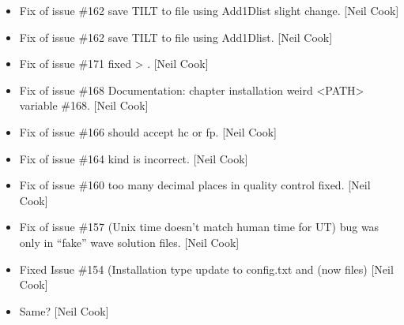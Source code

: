 \documentclass[a4paper,10pt,english]{report}
\begin{document}
\begin{itemize}
\item {} 
Fix of issue \#162 \sphinxhyphen{}  save TILT to file using Add1Dlist \sphinxhyphen{}
slight change. {[}Neil Cook{]}

\item {} 
Fix of issue \#162 \sphinxhyphen{}  save TILT to file using Add1Dlist. {[}Neil
Cook{]}

\item {} 
Fix of issue \#171 \sphinxhyphen{} fixed  \textendash{}\textgreater{}
. {[}Neil Cook{]}

\item {} 
Fix of issue \#168 \sphinxhyphen{} Documentation: chapter installation weird \textless{}PATH\textgreater{}
variable \#168. {[}Neil Cook{]}

\item {} 
Fix of issue \#166 \sphinxhyphen{}  should accept hc or fp. {[}Neil Cook{]}

\item {} 
Fix of issue \#164 \sphinxhyphen{}  kind is incorrect. {[}Neil Cook{]}

\item {} 
Fix of issue \#160 \sphinxhyphen{} too many decimal places in quality control \sphinxhyphen{}
fixed. {[}Neil Cook{]}

\item {} 
Fix of issue \#157 (Unix time doesn’t match human time for UT) bug was
only in “fake” wave solution files. {[}Neil Cook{]}

\item {} 
Fixed Issue \#154 (Installation type update to config.txt and
 (now  files) {[}Neil Cook{]}

\item {} 
Same? {[}Neil Cook{]}

\end{itemize}
\end{document}
